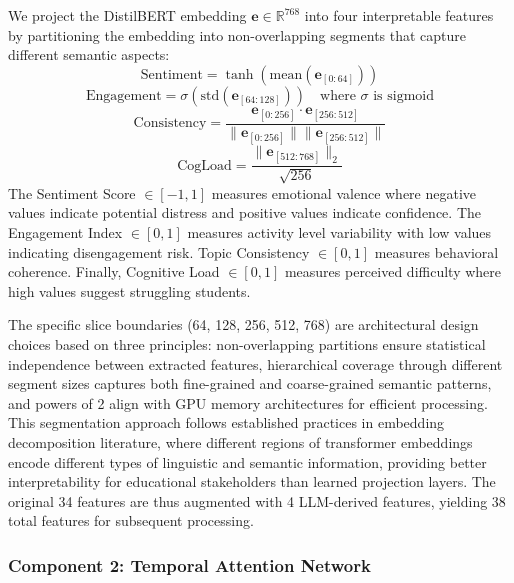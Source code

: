 \documentclass[journal]{IEEEtran}
\begin{document}
We project the DistilBERT embedding $\mathbf{e} \in \mathbb{R}^{768}$ into four interpretable features by partitioning the embedding into non-overlapping segments that capture different semantic aspects:
\begin{equation}
\text{Sentiment} = \tanh(\text{mean}(\mathbf{e}_{[0:64]}))
\end{equation}
\begin{equation}
\text{Engagement} = \sigma(\text{std}(\mathbf{e}_{[64:128]})) \quad \text{where } \sigma \text{ is sigmoid}
\end{equation}
\begin{equation}
\text{Consistency} = \frac{\mathbf{e}_{[0:256]} \cdot \mathbf{e}_{[256:512]}}{\|\mathbf{e}_{[0:256]}\| \|\mathbf{e}_{[256:512]}\|}
\end{equation}
\begin{equation}
\text{CogLoad} = \frac{\|\mathbf{e}_{[512:768]}\|_2}{\sqrt{256}}
\end{equation}
The Sentiment Score $\in [-1, 1]$ measures emotional valence where negative values indicate potential distress and positive values indicate confidence. The Engagement Index $\in [0, 1]$ measures activity level variability with low values indicating disengagement risk. Topic Consistency $\in [0, 1]$ measures behavioral coherence. Finally, Cognitive Load $\in [0, 1]$ measures perceived difficulty where high values suggest struggling students.

The specific slice boundaries (64, 128, 256, 512, 768) are architectural design choices based on three principles: non-overlapping partitions ensure statistical independence between extracted features, hierarchical coverage through different segment sizes captures both fine-grained and coarse-grained semantic patterns, and powers of 2 align with GPU memory architectures for efficient processing. This segmentation approach follows established practices in embedding decomposition literature, where different regions of transformer embeddings encode different types of linguistic and semantic information, providing better interpretability for educational stakeholders than learned projection layers. The original 34 features are thus augmented with 4 LLM-derived features, yielding 38 total features for subsequent processing.

\subsubsection{Component 2: Temporal Attention Network}
\end{document}
